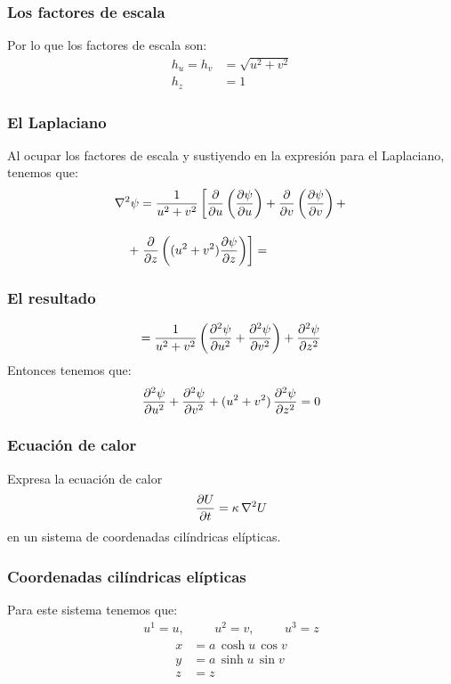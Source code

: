 \documentclass[12pt]{beamer}
\begin{document}
\begin{frame}
\frametitle{Los factores de escala}
Por lo que los factores de escala son:
\begin{align*}
h_{u} = h_{v} &= \sqrt{u^{2} + v^{2}} \\[0.5em]
h_{z} &= 1
\end{align*}
\end{frame}
\begin{frame}
\frametitle{El Laplaciano}
Al ocupar los factores de escala y sustiyendo en la expresión para el Laplaciano, tenemos que:
\begin{align*}
\laplacian{\psi} &= \dfrac{1}{u^{2} +v^{2}} \left[ \pdv{u} \left( \pdv{\psi}{u} \right) + \pdv{v} \left( \pdv{\psi}{v} \right) + \right. \\[1em]
+& \left. \pdv{z} \left( (u^{2} + v^{2}) \pdv{\psi}{z} \right) \right] =
\end{align*}
\end{frame}
\begin{frame}
\frametitle{El resultado}
\begin{align*}
= \dfrac{1}{u^{2} + v^{2}} \left( \pdv[2]{\psi}{u} + \pdv[2]{\psi}{v} \right) + \pdv[2]{\psi}{z}
\end{align*}
\pause
Entonces tenemos que:
\begin{align*}
\pdv[2]{\psi}{u} + \pdv[2]{\psi}{v} + (u^{2} + v^{2}) \, \pdv[2]{\psi}{z} = 0
\end{align*}
\end{frame}
\begin{frame}
\frametitle{Ecuación de calor }
Expresa la ecuación de calor
\begin{align*}
\pdv{U}{t} = \kappa \, \laplacian{U}
\end{align*}
en un sistema de coordenadas cilíndricas elípticas.
\end{frame}
\begin{frame}
\frametitle{Coordenadas cilíndricas elípticas}
Para este sistema tenemos que:
\begin{align*}
u^{1} = u, \hspace{1cm} u^{2} = v, \hspace{1cm} u^{3} = z
\end{align*}
\pause
\begin{align*}
x &= a \, \cosh u \, \cos v \\[0.5em]
y &=  a \, \sinh u \, \sin v \\[0.5em]
z &= z
\end{align*}
\end{frame}
\end{document}
